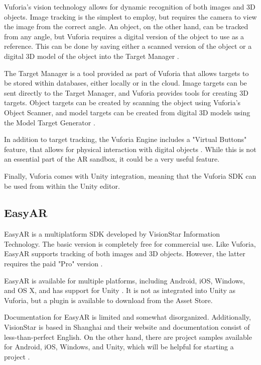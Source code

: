 \documentclass[letterpaper, 10pt, onecolumn, draftclsnofoot]{IEEEtran}
\begin{document}
Vuforia's vision technology allows for dynamic recognition of both images and 3D objects. Image tracking is the simplest to employ, but requires the camera to view the image from the correct angle. An object, on the other hand, can be tracked from any angle, but Vuforia requires a digital version of the object to use as a reference. This can be done by saving either a scanned version of the object or a digital 3D model of the object into the Target Manager \cite{vuforia-features}.

The Target Manager is a tool provided as part of Vuforia that allows targets to be stored within databases, either locally or in the cloud. Image targets can be sent directly to the Target Manager, and Vuforia provides tools for creating 3D targets. Object targets can be created by scanning the object using Vuforia's Object Scanner, and model targets can be created from digital 3D models using the Model Target Generator \cite{vuforia-tools}.

In addition to target tracking, the Vuforia Engine includes a "Virtual Buttons" feature, that allows for physical interaction with digital objects \cite{vuforia-features}. While this is not an essential part of the AR sandbox, it could be a very useful feature.

Finally, Vuforia comes with Unity integration, meaning that the Vuforia SDK can be used from within the Unity editor.

\subsection{EasyAR}
EasyAR is a multiplatform SDK developed by VisionStar Information Technology. The basic version is completely free for commercial use. Like Vuforia, EasyAR supports tracking of both images and 3D objects. However, the latter requires the paid "Pro" version \cite{easyar-prices}.

 EasyAR is available for multiple platforms, including Android, iOS, Windows, and OS X, and has support for Unity \cite{easyar-platforms}. It is not as integrated into Unity as Vuforia, but a plugin is available to download from the Asset Store.

Documentation for EasyAR is limited and somewhat disorganized. Additionally, VisionStar is based in Shanghai and their website and documentation consist of less-than-perfect English. On the other hand, there are project samples available for Android, iOS, Windows, and Unity, which will be helpful for starting a project \cite{easyar-docs}.
\end{document}
